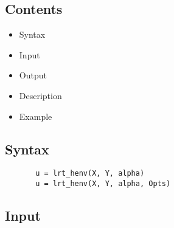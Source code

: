 \documentclass[a4paper,11pt,openany]{memoir}
\begin{document}
\subsection*{Contents}

\begin{itemize}
\setlength{\itemsep}{-1ex}
   \item Syntax
   \item Input
   \item Output
   \item Description
   \item Example
\end{itemize}


\subsection*{Syntax}


\begin{verbatim}       u = lrt_henv(X, Y, alpha)
       u = lrt_henv(X, Y, alpha, Opts)\end{verbatim}
    

\subsection*{Input}
\end{document}
